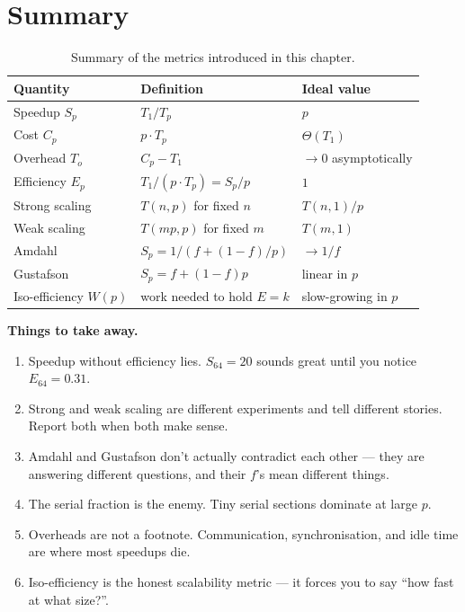 \section{Summary}

\begin{table}[h]
\centering
\renewcommand{\arraystretch}{1.3}
\begin{tabular}{@{}l l l@{}}
\toprule
\textbf{Quantity} & \textbf{Definition} & \textbf{Ideal value} \\ \midrule
Speedup $S_p$ & $T_1 / T_p$ & $p$ \\
Cost $C_p$ & $p \cdot T_p$ & $\Theta(T_1)$ \\
Overhead $T_o$ & $C_p - T_1$ & $\to 0$ asymptotically \\
Efficiency $E_p$ & $T_1 / (p \cdot T_p) = S_p / p$ & $1$ \\
Strong scaling & $T(n,p)$ for fixed $n$ & $T(n,1)/p$ \\
Weak scaling & $T(mp,p)$ for fixed $m$ & $T(m,1)$ \\
Amdahl & $S_p = 1/(f + (1-f)/p)$ & $\to 1/f$ \\
Gustafson & $S_p = f + (1-f)p$ & linear in $p$ \\
Iso-efficiency $W(p)$ & work needed to hold $E = k$ & slow-growing in $p$ \\
\bottomrule
\end{tabular}
\caption{Summary of the metrics introduced in this chapter.}
\label{tab:metrics-summary}
\end{table}

\begin{ppkey}
\textbf{Things to take away.}
\begin{enumerate}
  \item Speedup without efficiency lies. $S_{64} = 20$ sounds great until
        you notice $E_{64} = 0.31$.
  \item Strong and weak scaling are different experiments and tell
        different stories. Report both when both make sense.
  \item Amdahl and Gustafson don't actually contradict each other --- they
        are answering different questions, and their $f$'s mean different
        things.
  \item The serial fraction is the enemy. Tiny serial sections dominate
        at large $p$.
  \item Overheads are not a footnote. Communication, synchronisation, and
        idle time are where most speedups die.
  \item Iso-efficiency is the honest scalability metric --- it forces you
        to say ``how fast at what size?''.
\end{enumerate}
\end{ppkey}

